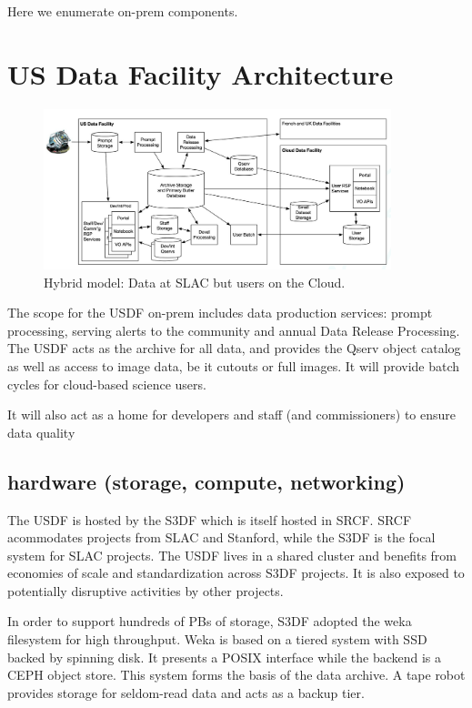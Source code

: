 Here we enumerate on-prem components.
\section {US Data Facility Architecture} \label{sec:usdfarch}


\begin{figure}
\begin{centering}
\includegraphics[width=0.9\textwidth]{hybrid}
	\caption{ Hybrid model: Data at SLAC but users on the Cloud.  \label{fig:usdfarch}}
\end{centering}
\end{figure}

The scope for the USDF on-prem includes data production services:
prompt processing, serving alerts to the community and annual Data
Release Processing. The USDF acts as the archive for all data, and
provides the Qserv object catalog as well as access to image data, be
it cutouts or full images. It will provide batch cycles for cloud-based science users.

It will also act as a home for developers and staff (and
commissioners) to ensure data quality



\subsection{hardware (storage, compute, networking)}

The USDF is hosted by the S3DF which is itself hosted in SRCF. SRCF
acommodates projects from SLAC and Stanford, while the S3DF is the
focal system for SLAC projects. The USDF lives in a shared cluster and
benefits from economies of scale and standardization across S3DF
projects. It is also exposed to potentially disruptive activities by
other projects.

In order to support hundreds of PBs of storage, S3DF adopted the weka
filesystem for high throughput. Weka is based on a tiered system with
SSD backed by spinning disk. It presents a POSIX interface while the
backend is a CEPH object store. This system forms the basis of the
data archive. A tape robot provides storage for seldom-read data and
acts as a backup tier.

